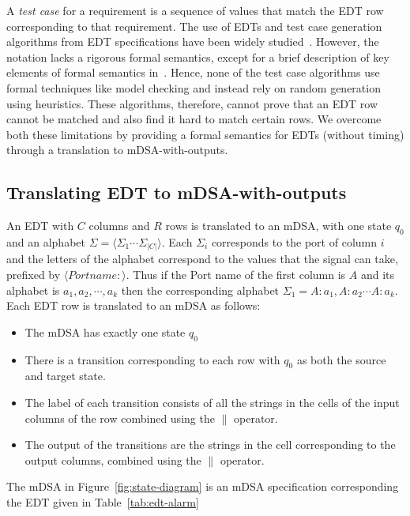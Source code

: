 A \emph{test case} for a requirement is a sequence of values  that match the
EDT row corresponding to that requirement. The use of EDTs and test case generation
algorithms from EDT specifications have been widely studied~\cite{DBLP:conf/enase/VenkateshSZA15a,DBLP:conf/icst/AgrawalVSZV20}. However, the notation lacks a rigorous
formal semantics, except for a brief description of key elements of formal
semantics in~\cite{DBLP:conf/date/VenkateshSKA14}. Hence, none of the test case algorithms use
formal techniques like model checking and instead rely on random generation
using heuristics. These algorithms, therefore, cannot prove that an EDT row
cannot be matched and also find it hard to match certain rows. We overcome both
these limitations by providing a formal semantics for EDTs (without timing)
through a translation to mDSA-with-outputs.


\subsection{Translating EDT to mDSA-with-outputs}

An EDT with $C$ columns and $R$ rows is translated to an mDSA, with one
state $q_0$ and an alphabet $\Sigma = \langle \Sigma_1 \cdots \Sigma_{|C|} \rangle$.
Each $\Sigma_i$ corresponds to the port of column $i$ and the
letters of the alphabet correspond to the values that the signal can take,
prefixed by $\langle Portname: \rangle$. 
Thus if the Port name of the first
column is $A$ and its alphabet is ${ a_1, a_2, \cdots, a_k}$ then the
corresponding alphabet $\Sigma_1 = {A:a_1, A:a_2 \cdots A:a_k}$. 
Each EDT row is translated to an mDSA as follows:
\begin{itemize}
\item The mDSA has exactly one state $q_0$

\item
There is a transition corresponding to each row with $q_0$ as both the source and target state. 
\item
The label of each transition consists of all the strings in the cells of the input columns of the row combined using the $\parallel$ operator.
\item 
The output of the transitions are the strings in the cell corresponding to the output columns, combined using the $\parallel$ operator.
\end{itemize}

The mDSA in Figure~\ref{fig:state-diagram} is an mDSA specification corresponding the EDT given in Table~\ref{tab:edt-alarm}

